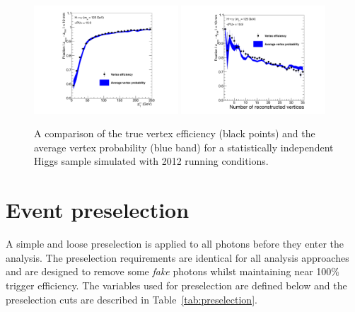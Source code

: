 \begin{figure}
  \includegraphics[width=0.48\textwidth]{analysis_comps/plots/vtxProbPt.pdf}
  \includegraphics[width=0.48\textwidth]{analysis_comps/plots/vtxProbNvtx.pdf}
  \caption[A comparison of the true vertex efficiency and the average vertex probability]{A comparison of the true vertex efficiency (black points) and the average vertex probability (blue band) for a statistically independent \MC Higgs sample simulated with 2012 running conditions.}
  \label{fig:vertex_bdt_prob_efficiency}
\end{figure}

\section{Event preselection}
\label{sec:photon_presel}

A simple and loose preselection is applied to all photons before they enter the analysis. The preselection requirements are identical for all analysis approaches and are designed to remove some \emph{fake} photons whilst maintaining near 100\% trigger efficiency. The variables used for preselection are defined below and the preselection cuts are described in Table~\ref{tab:preselection}.

